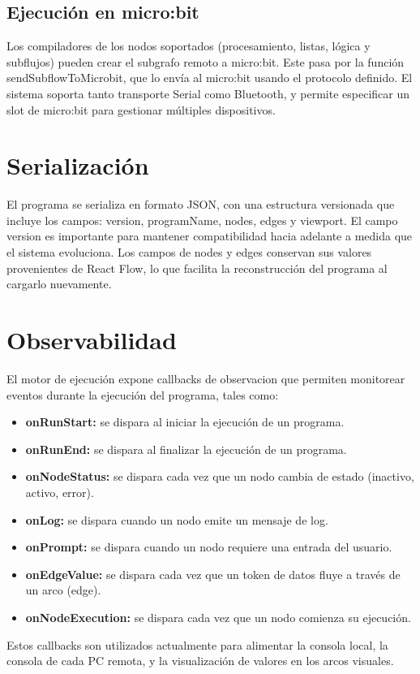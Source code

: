 \subsection*{Ejecución en micro:bit}

Los compiladores de los nodos soportados (procesamiento, listas, lógica y subflujos) pueden crear el subgrafo remoto a micro:bit. Este pasa por la función sendSubflowToMicrobit, que lo envía al micro:bit usando el protocolo definido. El sistema soporta tanto transporte Serial como Bluetooth, y permite especificar un slot de micro:bit para gestionar múltiples dispositivos.

\section*{Serialización}

El programa se serializa en formato JSON, con una estructura versionada que incluye los campos: version, programName, nodes, edges y viewport. El campo version es importante para mantener compatibilidad hacia adelante a medida que el sistema evoluciona. Los campos de nodes y edges conservan sus valores provenientes de React Flow, lo que facilita la reconstrucción del programa al cargarlo nuevamente.

\section*{Observabilidad}

El motor de ejecución expone callbacks de observacion que permiten monitorear eventos durante la ejecución del programa, tales como:

\begin{itemize}
    \item \textbf{onRunStart:} se dispara al iniciar la ejecución de un programa.
    \item \textbf{onRunEnd:} se dispara al finalizar la ejecución de un programa.
    \item \textbf{onNodeStatus:} se dispara cada vez que un nodo cambia de estado (inactivo, activo, error).
    \item \textbf{onLog:} se dispara cuando un nodo emite un mensaje de log.
    \item \textbf{onPrompt:} se dispara cuando un nodo requiere una entrada del usuario.
    \item \textbf{onEdgeValue:} se dispara cada vez que un token de datos fluye a través de un arco (edge).
    \item \textbf{onNodeExecution:} se dispara cada vez que un nodo comienza su ejecución.
\end{itemize}

Estos callbacks son utilizados actualmente para alimentar la consola local, la consola de cada PC remota, y la visualización de valores en los arcos visuales.
